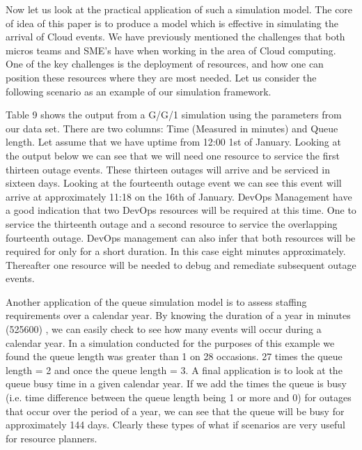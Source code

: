 \documentclass[5p]{elsarticle}
\begin{document}
Now let us look at the practical application of such a simulation model. The core of idea of this paper is to produce a model which is effective in simulating the arrival of Cloud events. We have previously mentioned the challenges that both micros teams and SME's have when working in the area of Cloud computing. One of the key challenges is the deployment of resources, and how one can position these resources where they are most needed. Let us consider the following scenario as an example of our simulation framework. 

Table 9 shows the output from a G/G/1 simulation using the parameters from our data set. There are two columns: Time (Measured in minutes) and Queue length. Let assume that  we have uptime from 12:00 1st of January. Looking at the output below we can see that we will need one resource to service the first  thirteen outage events. These thirteen outages will arrive and be serviced in sixteen days. Looking at the fourteenth outage event we can see this event will arrive at approximately 11:18 on the 16th of January. DevOps Management have a good indication that two DevOps resources will be required at this time.  One to service the thirteenth outage and a second resource to service the overlapping fourteenth outage. DevOps management can also infer that both resources will be required for only for a short duration. In this case eight minutes approximately. Thereafter one resource will be needed to debug and remediate subsequent outage events.

Another application of the queue simulation model is to assess staffing requirements over a calendar year. By knowing the duration of a year in minutes (525600) , we can easily check to see how many events will occur during a calendar year. In a simulation conducted for the purposes of this example we found the queue length was greater than 1 on 28 occasions. 27 times the queue length = 2 and once the queue length = 3. A final application is to look at the queue busy time in a given calendar year. If we add the times the queue is busy (i.e. time difference between the queue length being 1 or more and 0) for outages that occur over the period of a year, we can see that the queue will be busy for approximately 144 days. Clearly these types of what if scenarios are very useful for resource planners.
\end{document}
